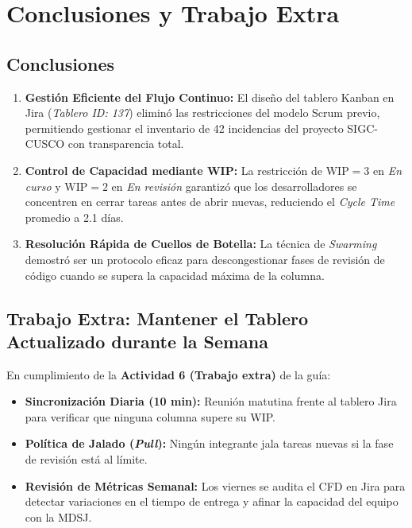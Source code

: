 \section{Conclusiones y Trabajo Extra}

\subsection{Conclusiones}
\begin{enumerate}[leftmargin=*]
    \item \textbf{Gestión Eficiente del Flujo Continuo:} El diseño del tablero Kanban en Jira (\textit{Tablero ID: 137}) eliminó las restricciones del modelo Scrum previo, permitiendo gestionar el inventario de 42 incidencias del proyecto SIGC-CUSCO con transparencia total.
    \item \textbf{Control de Capacidad mediante WIP:} La restricción de $\text{WIP} = 3$ en \textit{En curso} y $\text{WIP} = 2$ en \textit{En revisión} garantizó que los desarrolladores se concentren en cerrar tareas antes de abrir nuevas, reduciendo el \textit{Cycle Time} promedio a 2.1 días.
    \item \textbf{Resolución Rápida de Cuellos de Botella:} La técnica de \textit{Swarming} demostró ser un protocolo eficaz para descongestionar fases de revisión de código cuando se supera la capacidad máxima de la columna.
\end{enumerate}

\subsection{Trabajo Extra: Mantener el Tablero Actualizado durante la Semana}
En cumplimiento de la \textbf{Actividad 6 (Trabajo extra)} de la guía:
\begin{itemize}[leftmargin=*]
    \item \textbf{Sincronización Diaria (10 min):} Reunión matutina frente al tablero Jira para verificar que ninguna columna supere su WIP.
    \item \textbf{Política de Jalado (\textit{Pull}):} Ningún integrante jala tareas nuevas si la fase de revisión está al límite.
    \item \textbf{Revisión de Métricas Semanal:} Los viernes se audita el CFD en Jira para detectar variaciones en el tiempo de entrega y afinar la capacidad del equipo con la MDSJ.
\end{itemize}
